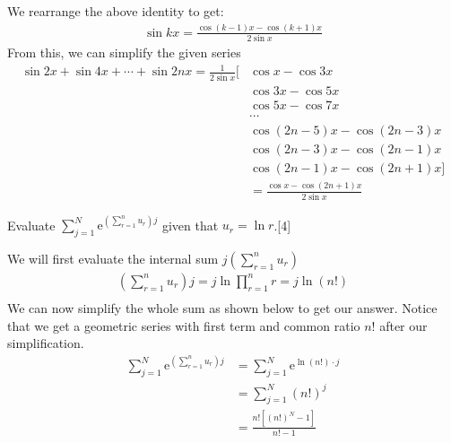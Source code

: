 \documentclass[12pt, a4 paper]{article}
\begin{document}
\begin{outline}[enumerate]
\begin{answer}
   We rearrange the above identity to get:
   \begin{align*}
     \sin{kx} = \frac{\cos{(k-1)x}-\cos{(k+1)x}}{2\sin x}
   \end{align*}
   From this, we can simplify the given series
   \begin{align*}
     \sin{2x}+\sin{4x}+\cdots+\sin{2nx} = \frac{1}{2\sin x}[& \cos x - \cos 3x \\
     & \cos 3x - \cos 5x \\
     & \cos5x - \cos 7x \\
     & \cdots \\
     & \cos{(2n-5)x} - \cos{(2n-3)x} \\
     & \cos{(2n-3)x} - \cos{(2n-1)x} \\
     & \cos{(2n-1)x} - \cos{(2n+1)x}] \\
     &= \frac{\cos x - \cos{(2n+1)x}}{2\sin x}
   \end{align*}
 \end{answer}

 \1 Evaluate \(\sum\limits_{j=1}^{N}\mathrm{e}^{\left(\sum\limits_{r=1}^{n}u_{r}\right)j}\) given that \(u_{r}=\ln{r}\).\hfill[4]%
 \begin{answer}
  We will first evaluate the internal sum \(j\left(\sum\limits_{r=1}^{n}u_{r}\right)\)
  \begin{align*}
   (\sum\limits_{r=1}^{n}u_{r})j= j\ln\prod_{r=1}^n r = j\ln{(n!)} \\
  \end{align*}
  We can now simplify the whole sum as shown below to get our answer. Notice that we get a geometric series with first term and common ratio \(n! \) after our simplification.
  \begin{align*}
   \sum\limits_{j=1}^{N}\mathrm{e}^{\left(\sum\limits_{r=1}^{n}u_{r}\right)j} & =      \sum\limits_{j=1}^{N}\mathrm{e}^{\ln(n!) \cdot j} \\
                                                                              & = \sum\limits_{j=1}^{N}{(n!)}^j                          \\
                                                                              & = \frac{n![{(n!)}^N-1]}{n!-1}
  \end{align*}
 \end{answer}
\end{outline}
\end{document}

